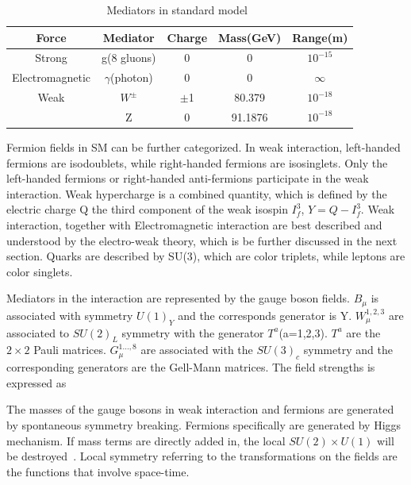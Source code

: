 \begin{table}[htp]
\caption{Mediators in standard model~\cite{Griffiths:111880}}
\begin{center}
\begin{tabular}{|c|c|c|c|c|}
\hline
Force & Mediator & Charge & Mass(GeV) & Range(m)   \\\hline
Strong                & g(8 gluons)                  & 0 & 0 & $10^{-15}$   \\\hline
Electromagnetic & $\gamma$(photon)     & 0 & 0 &   $\infty$   \\\hline
Weak                  &  $W^{\pm}$                &$\pm$1 & 80.379 &$10^{-18}$\\
                           & Z                                &  0         & 91.1876 &  $10^{-18}$ \\\hline
\end{tabular}
\end{center}
\label{Mediator_infor}
\end{table}%


Fermion fields in SM can be further categorized. In weak interaction, left-handed fermions are isodoublets, while right-handed fermions are isosinglets. Only the left-handed fermions or right-handed anti-fermions participate in the weak interaction. Weak hypercharge is a combined quantity, which is defined by the electric charge Q the third component of the weak isospin $I^{3}_{f}$, $Y=Q-I^{3}_{f}$. Weak interaction, together with Electromagnetic interaction are best described and understood by the electro-weak theory, which is be further discussed in the next section.  Quarks are described by SU(3), which are color triplets, while leptons are color singlets.   

Mediators in the interaction are represented by the gauge boson fields. $B_{\mu}$ is associated with symmetry $U(1)_{Y}$ and the corresponds generator is Y. $W_{\mu}^{1,2,3}$ are associated to $SU(2)_{L}$ symmetry with the generator $T^{a}$(a=1,2,3). $T^{a}$ are the $2\times2$ Pauli matrices. $G_{\mu}^{1...,8}$ are associated with the $SU(3)_{c}$ symmetry and the corresponding generators are the Gell-Mann matrices.  The field strengths is expressed as 






The masses of the gauge bosons in weak interaction and fermions are generated by spontaneous symmetry breaking. Fermions specifically are generated by Higgs mechanism.  If mass terms are directly added in, the local $SU(2)\times U(1)$ will be destroyed~\cite{DJOUADI20081}. Local symmetry referring to the transformations on the fields are the functions that involve space-time.  






